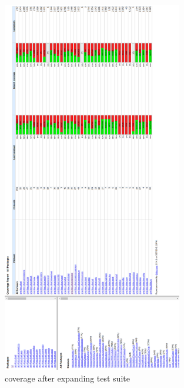 \documentclass{article}
\begin{document}
\newpage
\begin{figure}[H]
\centering
	\includegraphics[width=0.7\textwidth]{coverage/AFTER_TESTS.png}
	\caption{coverage after expanding test suite}
\end{figure}
\end{document}
